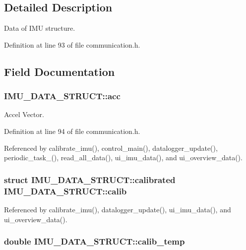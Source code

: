 \subsection{Detailed Description}
Data of IMU structure. 

Definition at line 93 of file communication.h.



\subsection{Field Documentation}
\hypertarget{structIMU__DATA__STRUCT_a448f284bf44eb503affda586ad5fa9d2}{
\subsubsection[{acc}]{ {\bf IMU\_\-DATA\_\-STRUCT::acc}}}
\label{structIMU__DATA__STRUCT_a448f284bf44eb503affda586ad5fa9d2}


Accel Vector. 



Definition at line 94 of file communication.h.



Referenced by calibrate\_\-imu(), control\_\-main(), datalogger\_\-update(), periodic\_\-task\_(), read\_\-all\_\-data(), ui\_\-imu\_\-data(), and ui\_\-overview\_\-data().

\hypertarget{structIMU__DATA__STRUCT_aeffe3c3c5a7191a5cef16e7aab6c3795}{
\subsubsection[{calib}]{\setlength{\rightskip}{0pt plus 5cm}struct {\bf IMU\_\-DATA\_\-STRUCT::calibrated} {\bf IMU\_\-DATA\_\-STRUCT::calib}}}
\label{structIMU__DATA__STRUCT_aeffe3c3c5a7191a5cef16e7aab6c3795}


Referenced by calibrate\_\-imu(), datalogger\_\-update(), ui\_\-imu\_\-data(), and ui\_\-overview\_\-data().

\hypertarget{structIMU__DATA__STRUCT_a3553fcee6beba17fe0c7711ac0483875}{
\subsubsection[{calib\_\-temp}]{\setlength{\rightskip}{0pt plus 5cm}double {\bf IMU\_\-DATA\_\-STRUCT::calib\_\-temp}}}
\label{structIMU__DATA__STRUCT_a3553fcee6beba17fe0c7711ac0483875}


